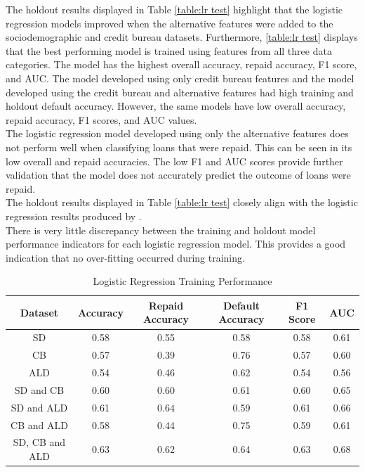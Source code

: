 The holdout results displayed in Table \ref{table:lr test} highlight that the logistic regression models improved when the alternative features were added to the sociodemographic and credit bureau datasets. Furthermore, \ref{table:lr test} displays that the best performing model is trained using features from all three data categories. The model has the highest overall accuracy, repaid accuracy, F1 score, and AUC. The model developed using only credit bureau features and the model developed using the credit bureau and alternative features had high training and holdout default accuracy. However, the same models have low overall accuracy, repaid accuracy, F1 scores, and AUC values.  \\

The logistic regression model developed using only the alternative features does not perform well when classifying loans that were repaid. This can be seen in its low overall and repaid accuracies. The low F1 and AUC scores provide further validation that the model does not accurately predict the outcome of loans were repaid. \\

The holdout results displayed in Table \ref{table:lr test} closely align with the logistic regression results produced by \textcite{BigDataMicroFiance}. \\

There is very little discrepancy between the training and holdout model performance indicators for each logistic regression model. This provides a good indication that no over-fitting occurred during training. 

\vspace{10pt}

\begin{table}[H]
\begin{center}
\begin{tabular}{|c|c|c|c|c|c|} 
\hline
\multicolumn{1}{|c|}{Dataset}
&\multicolumn{1}{|c|}{Accuracy}
&\multicolumn{1}{|c|}{Repaid Accuracy}
&\multicolumn{1}{|c|}{Default Accuracy}
&\multicolumn{1}{|c|}{F1 Score}
&\multicolumn{1}{|c|}{AUC}\\
\hline
SD & 0.58 & 0.55 & 0.58 & 0.58 & 0.61    \\
\hline
CB & 0.57 & 0.39 & 0.76 & 0.57 & 0.60    \\
\hline
ALD & 0.54 & 0.46 & 0.62 & 0.54 & 0.56    \\
\hline
SD and CB & 0.60 & 0.60 & 0.61 & 0.60 & 0.65    \\
\hline
SD and ALD & 0.61 & 0.64 & 0.59 & 0.61 & 0.66    \\
\hline
CB and ALD & 0.58 & 0.44 & 0.75 & 0.59 & 0.61    \\
\hline
SD, CB and ALD & 0.63 & 0.62 & 0.64 & 0.63 & 0.68    \\
\hline
\end{tabular}
\end{center}
\caption{Logistic Regression Training Performance}
\label{table:lr training}
\end{table}

